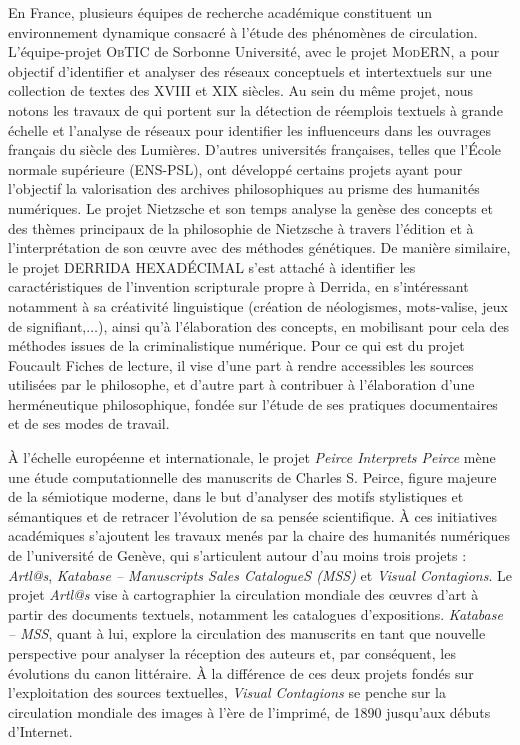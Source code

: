 En France, plusieurs équipes de recherche académique constituent un environnement dynamique consacré à l'étude des phénomènes de circulation. L'équipe-projet \textsc{ObTIC} de Sorbonne Université, avec le projet \textsc{ModERN}, a pour objectif d'identifier et analyser des réseaux conceptuels et intertextuels sur une collection de textes des XVIII\ieme{} et XIX\ieme{} siècles. Au sein du même projet, nous notons les travaux de \citet{roe2023enlightenment} qui portent sur la détection de réemplois textuels à grande échelle et l'analyse de réseaux pour identifier les \og{}influenceurs\fg{} dans les ouvrages français du siècle des Lumières.
D'autres universités françaises, telles que l'École normale supérieure (\textsc{ENS-PSL}), ont développé certains projets ayant pour l'objectif la valorisation des archives philosophiques au prisme des humanités numériques. Le projet \og{}Nietzsche et son temps\fg{} analyse la genèse des concepts et des thèmes principaux de la philosophie de Nietzsche à travers l'édition et à l’interprétation de son \oe{}uvre avec des méthodes génétiques. De manière similaire, le projet \og{}DERRIDA HEXADÉCIMAL\fg{} s'est attaché à identifier les caractéristiques de l'invention scripturale propre à Derrida, en s'intéressant notamment à sa créativité linguistique (création de néologismes, mots-valise, jeux de signifiant,$\dots$), ainsi qu'à l'élaboration des concepts, en mobilisant pour cela des méthodes issues de la criminalistique numérique. Pour ce qui est du projet \og{}Foucault Fiches de lecture\fg{}, il vise d'une part à rendre accessibles les sources utilisées par le philosophe, et d'autre part à contribuer à l'élaboration d'une herméneutique philosophique, fondée sur l'étude de ses pratiques documentaires et de ses modes de travail.

À l'échelle européenne et internationale, le projet \textit{Peirce Interprets Peirce} mène une étude computationnelle des manuscrits de Charles S. Peirce, figure majeure de la sémiotique moderne, dans le but d'analyser des motifs stylistiques et sémantiques et de retracer l'évolution de sa pensée scientifique. À ces initiatives académiques s'ajoutent les travaux menés par la chaire des humanités numériques de l'université de Genève, qui s'articulent autour d'au moins trois projets : \textit{Artl@s}, \textit{Katabase -- Manuscripts Sales CatalogueS (MSS)} et \textit{Visual Contagions}. Le projet \textit{Artl@s} vise à cartographier la circulation mondiale des \oe{}uvres d'art à partir des documents textuels, notamment les catalogues d'expositions. \textit{Katabase -- MSS}, quant à lui, explore la circulation des manuscrits en tant que nouvelle perspective pour analyser la réception des auteurs et, par conséquent, les évolutions du canon littéraire. À la différence de ces deux projets fondés sur l'exploitation des sources textuelles, \textit{Visual Contagions} se penche sur la circulation mondiale des images à l'ère de l'imprimé, de 1890 jusqu'aux débuts d'Internet. 

